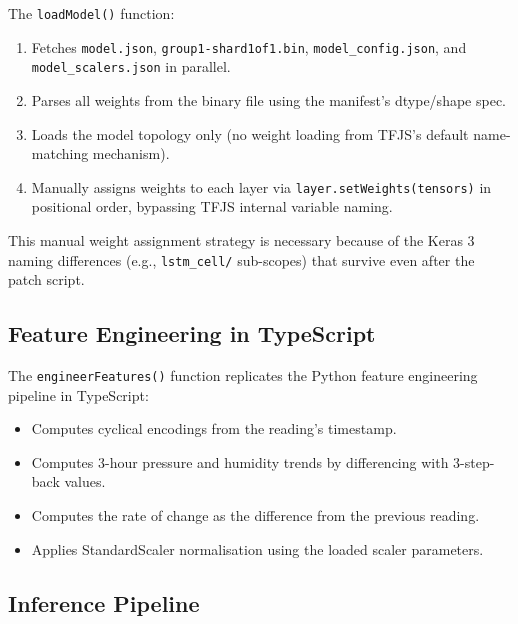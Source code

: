The \texttt{loadModel()} function:
\begin{enumerate}[leftmargin=1.5em]
  \item Fetches \texttt{model.\allowbreak{}json}, \texttt{group1-shard1of1.\allowbreak{}bin}, \texttt{model\_\allowbreak{}config.\allowbreak{}json}, and \texttt{model\_\allowbreak{}scalers.\allowbreak{}json} in parallel.
  \item Parses all weights from the binary file using the manifest's dtype/shape spec.
  \item Loads the model topology only (no weight loading from TFJS's default name-matching mechanism).
  \item Manually assigns weights to each layer via \texttt{layer.\allowbreak{}setWeights(tensors)} in positional order, bypassing TFJS internal variable naming.
\end{enumerate}

This manual weight assignment strategy is necessary because of the Keras 3 naming differences (e.g., \texttt{lstm\_\allowbreak{}cell/\allowbreak{}} sub-scopes) that survive even after the patch script.

\subsection{Feature Engineering in TypeScript}

The \texttt{engineerFeatures()} function replicates the Python feature engineering pipeline in TypeScript:
\begin{itemize}[leftmargin=1.5em]
  \item Computes cyclical encodings from the reading's timestamp.
  \item Computes 3-hour pressure and humidity trends by differencing with 3-step-back values.
  \item Computes the rate of change as the difference from the previous reading.
  \item Applies StandardScaler normalisation using the loaded scaler parameters.
\end{itemize}

\subsection{Inference Pipeline}

